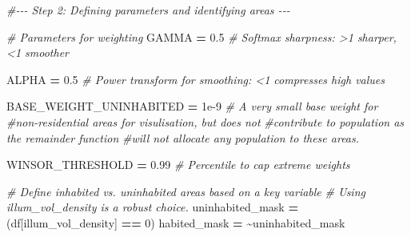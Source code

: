 \documentclass[
  12pt,
  oneside]{book}
\newenvironment{Shaded}{\begin{snugshade}}{\end{snugshade}}
\newcommand{\CommentTok}[1]{\textcolor[rgb]{0.56,0.35,0.01}{\textit{#1}}}
\newcommand{\DecValTok}[1]{\textcolor[rgb]{0.00,0.00,0.81}{#1}}
\newcommand{\FloatTok}[1]{\textcolor[rgb]{0.00,0.00,0.81}{#1}}
\newcommand{\NormalTok}[1]{#1}
\newcommand{\OperatorTok}[1]{\textcolor[rgb]{0.81,0.36,0.00}{\textbf{#1}}}
\newcommand{\StringTok}[1]{\textcolor[rgb]{0.31,0.60,0.02}{#1}}
\begin{document}
\begin{Shaded}
\begin{Highlighting}[numbers=left,,]
\CommentTok{\#{-}{-}{-} Step 2: Defining parameters and identifying areas {-}{-}{-}}

\CommentTok{\# Parameters for weighting}
\NormalTok{GAMMA }\OperatorTok{=} \FloatTok{0.5}  \CommentTok{\# Softmax sharpness: \textgreater{}1 sharper, \textless{}1 smoother}

\NormalTok{ALPHA }\OperatorTok{=} \FloatTok{0.5}  \CommentTok{\# Power transform for smoothing: \textless{}1 compresses high values}

\NormalTok{BASE\_WEIGHT\_UNINHABITED }\OperatorTok{=} \FloatTok{1e{-}9} \CommentTok{\# A very small base weight for }
\CommentTok{\#non{-}residential areas for visulisation, but does not }
\CommentTok{\#contribute to population as the remainder function }
\CommentTok{\#will not allocate any population to these areas.}

\NormalTok{WINSOR\_THRESHOLD }\OperatorTok{=} \FloatTok{0.99} \CommentTok{\# Percentile to cap extreme weights}

\CommentTok{\# Define inhabited vs. uninhabited areas based on a key variable}
\CommentTok{\# Using \textquotesingle{}illum\_vol\_density\textquotesingle{} is a robust choice.}
\NormalTok{uninhabited\_mask }\OperatorTok{=}\NormalTok{ (df[}\StringTok{\textquotesingle{}illum\_vol\_density\textquotesingle{}}\NormalTok{] }\OperatorTok{==} \DecValTok{0}\NormalTok{)}
\NormalTok{habited\_mask }\OperatorTok{=} \OperatorTok{\textasciitilde{}}\NormalTok{uninhabited\_mask}
\end{Highlighting}
\end{Shaded}
\end{document}
